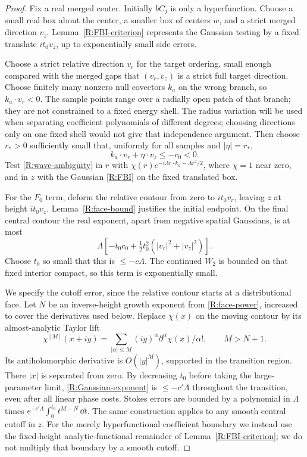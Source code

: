 \begin{proof}
Fix a real merged center.  Initially $bC_j$ is only a hyperfunction.
Choose a small real box about the center, a smaller box of centers
$w$, and a strict merged direction $v_z$.  Lemma~\ref{R:FBI-criterion}
represents the Gaussian testing by a fixed translate $it_0v_z$,
up to exponentially small side errors.

Choose a strict relative direction $v_r$ for the target ordering,
small enough compared with the merged gaps that $(v_r,v_z)$ is a
strict full target direction.  Choose finitely many nonzero null
covectors $k_a$ on the wrong branch, so $k_a\cdot v_r<0$.
The sample points range over a radially open patch of that branch;
they are not constrained to a fixed energy shell.
The radius variation will be used when separating coefficient
polynomials of different degrees; choosing directions only on one
fixed shell would not give that independence argument.
Then choose
$r_*>0$ sufficiently small that, uniformly for all samples and
$|\eta|=r_*$,
\begin{equation}\label{R:negative-phase}
 k_a\cdot v_r+\eta\cdot v_z\leq-c_0<0.
\end{equation}
Test \eqref{R:wave-ambiguity} in $r$ with
$\chi(r)e^{-i\Lambda r\cdot k_a-\Lambda r^2/2}$, where $\chi=1$
near zero, and in $z$ with the Gaussian
\eqref{R:FBI} on the fixed translated box.

For the $F_0$ term, deform the relative contour from zero to
$it_0v_r$, leaving $z$ at height $it_0v_z$.
Lemma~\ref{R:face-bound} justifies the initial endpoint.  On the final
central contour the real exponent, apart from negative spatial
Gaussians, is at most
\[
 \Lambda\left[-t_0c_0+
                  \tfrac12t_0^2(|v_r|^2+|v_z|^2)\right].
\]
Choose $t_0$ so small that this is $\leq-c\Lambda$.  The continued
$W_2$ is bounded on that fixed interior compact, so this term is
exponentially small.

We specify the cutoff error, since the relative contour starts at a
distributional face.  Let $N$ be an inverse-height growth exponent
from \eqref{R:face-power}, increased to cover the derivatives used
below.  Replace $\chi(x)$ on the moving contour by its almost-analytic
Taylor lift
\[
 \chi^{[M]}(x+iy)=
     \sum_{|\alpha|\leq M}(iy)^\alpha\partial^\alpha\chi(x)/\alpha!,
 \qquad M>N+1.
\]
Its antiholomorphic derivative is $O(|y|^M)$, supported in the
transition region.  There $|x|$ is separated from zero.  By decreasing
$t_0$ before taking the large-parameter limit,
\eqref{R:Gaussian-exponent} is $\leq-c'\Lambda$ throughout the
transition, even after all linear phase costs.  Stokes errors are
bounded by a polynomial in $\Lambda$ times
$e^{-c'\Lambda}\int_0^{t_0}t^{M-N}\,\dd t$.
The same construction applies to any smooth central cutoff in $z$.
For the merely hyperfunctional coefficient boundary we instead use
the fixed-height analytic-functional remainder of
Lemma~\ref{R:FBI-criterion}; we do not multiply that boundary by a
smooth cutoff.


\end{proof}
